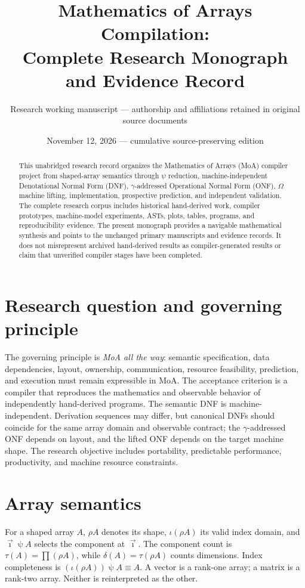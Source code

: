 \documentclass[11pt]{article}
\title{Mathematics of Arrays Compilation:\\Complete Research Monograph and Evidence Record}
\author{Research working manuscript --- authorship and affiliations retained in original source documents}
\date{November 12, 2026 --- cumulative source-preserving edition}
\newcommand{\psisel}{\mathbin{\psi}}
\begin{document}
\maketitle
\begin{abstract}
This unabridged research record organizes the Mathematics of Arrays (MoA) compiler project from shaped-array semantics through $\psi$ reduction, machine-independent Denotational Normal Form (DNF), $\gamma$-addressed Operational Normal Form (ONF), $\Omega$ machine lifting, implementation, prospective prediction, and independent validation. The complete research corpus includes historical hand-derived work, compiler prototypes, machine-model experiments, ASTs, plots, tables, programs, and reproducibility evidence. The present monograph provides a navigable mathematical synthesis and points to the unchanged primary manuscripts and evidence records. It does not misrepresent archived hand-derived results as compiler-generated results or claim that unverified compiler stages have been completed.
\end{abstract}
\tableofcontents

\section{Research question and governing principle}
The governing principle is \emph{MoA all the way}: semantic specification, data dependencies, layout, ownership, communication, resource feasibility, prediction, and execution must remain expressible in MoA. The acceptance criterion is a compiler that reproduces the mathematics and observable behavior of independently hand-derived programs. The semantic DNF is machine-independent. Derivation sequences may differ, but canonical DNFs should coincide for the same array domain and observable contract; the $\gamma$-addressed ONF depends on layout, and the lifted ONF depends on the target machine shape. The research objective includes portability, predictable performance, productivity, and machine resource constraints.

\section{Array semantics}
For a shaped array $A$, $\rho A$ denotes its shape, $\iota(\rho A)$ its valid index domain, and $\vec\imath\psisel A$ selects the component at $\vec\imath$. The component count is $\tau(A)=\prod(\rho A)$, while $\delta(A)=\tau(\rho A)$ counts dimensions. Index completeness is $(\iota(\rho A))\psisel A\equiv A$. A vector is a rank-one array; a matrix is a rank-two array. Neither is reinterpreted as the other.
\end{document}
